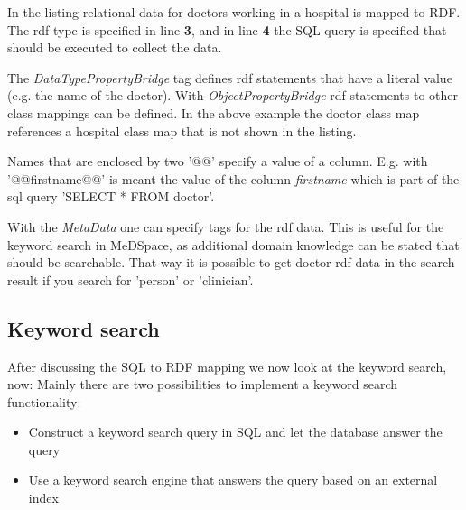 In the listing relational data for doctors working in a hospital is mapped to RDF. The rdf type is specified in line \textbf{3}, and in line \textbf{4} the SQL query is specified that should be executed to collect the data. 

The \emph{DataTypePropertyBridge} tag defines rdf statements that have a literal value (e.g. the name of the doctor). 
With \emph{ObjectPropertyBridge} rdf statements to other class mappings can be defined. In the above example the doctor class map references a hospital class map that is not shown in the listing. 

Names that are enclosed by two '@@' specify a value of a column. E.g. with '@@firstname@@' is meant the value of the column \emph{firstname} which is part of the sql query 'SELECT * FROM doctor'.

With the \emph{MetaData} one can specify tags for the rdf data. This is useful for the keyword search in MeDSpace, as additional domain knowledge can be stated that should be searchable. That way it is possible to get doctor rdf data in the search result if you search for 'person' or 'clinician'. 

\subsection{Keyword search}

After discussing the SQL to RDF mapping we now look at the keyword search, now:
Mainly there are two possibilities to implement a keyword search functionality:
\begin{itemize}
	\item {Construct a keyword search query in SQL and let the database answer the query}
	
	\item {Use a keyword search engine that answers the query based on an external index}
\end{itemize}

